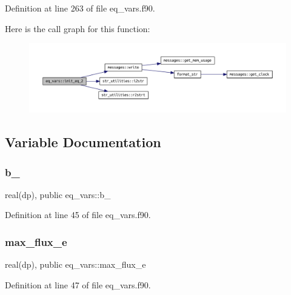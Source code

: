 Definition at line 263 of file eq\+\_\+vars.\+f90.

Here is the call graph for this function\+:
\nopagebreak
\begin{figure}[H]
\begin{center}
\leavevmode
\includegraphics[width=350pt]{namespaceeq__vars_a93947b772250ef73b25bde7688b33bc2_cgraph}
\end{center}
\end{figure}


\subsection{Variable Documentation}
\mbox{\label{namespaceeq__vars_acdd2464f2282359a818e4159b502e84b}} 
\subsubsection{\texorpdfstring{b\+\_}{b\_0}}
{\footnotesize\ttfamily real(dp), public eq\+\_\+vars\+::b\+\_}



Definition at line 45 of file eq\+\_\+vars.\+f90.

\mbox{\label{namespaceeq__vars_a863feef76ae60309d2e3ed4eed6bd436}} 
\subsubsection{\texorpdfstring{max\+\_\+flux\+\_\+e}{max\_flux\_e}}
{\footnotesize\ttfamily real(dp), public eq\+\_\+vars\+::max\+\_\+flux\+\_\+e}



Definition at line 47 of file eq\+\_\+vars.\+f90.

\mbox{\label{namespaceeq__vars_a46c97bf2a6d6eca952ca5173fcf9cdcb}} 
